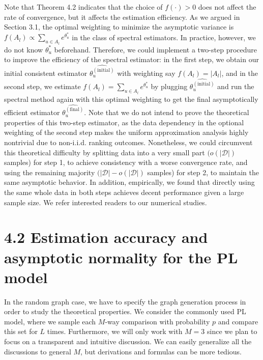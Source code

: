 Note that Theorem 4.2 indicates that the choice of \(f(\cdot) > 0\) does not affect the rate of convergence, but it affects the estimation efficiency. As we argued in Section 3.1, the optimal weighting to minimize the asymptotic variance is \(f(A_{l})\propto \sum_{u\in A_{l}}e^{\theta_{u}^{*}}\) in the class of spectral estimators. In practice, however, we do not know \(\theta_{u}^{*}\) beforehand. Therefore, we could implement a two-step procedure to improve the efficiency of the spectral estimator: in the first step, we obtain our initial consistent estimator \(\widehat{\theta_{u}^{(\mathrm{initial})}}\) with weighting say \(f(A_{l}) = |A_{l}|\), and in the second step, we estimate \(f(A_{l}) = \sum_{u\in A_{l}}e^{\theta_{u}^{*}}\) by plugging \(\widehat{\theta_{u}^{(\mathrm{initial})}}\) and run the spectral method again with this optimal weighting to get the final asymptotically efficient estimator \(\widehat{\theta_{u}^{(\mathrm{final})}}\). Note that we do not intend to prove the theoretical properties of this two-step estimator, as the data dependency in the optional weighting of the second step makes the uniform approximation analysis highly nontrivial due to non-i.i.d. ranking outcomes. Nonetheless, we could circumvent this theoretical difficulty by splitting data into a very small part \((o(|\mathcal{D}|)\) samples) for step 1, to achieve consistency with a worse convergence rate, and using the remaining majority \((|\mathcal{D}| - o(|\mathcal{D}|)\) samples) for step 2, to maintain the same asymptotic behavior. In addition, empirically, we found that directly using the same whole data in both steps achieves decent performance given a large sample size. We refer interested readers to our numerical studies.

\section{4.2 Estimation accuracy and asymptotic normality for the PL model}\label{estimation-accuracy-and-asymptotic-normality-for-the-pl-model}

In the random graph case, we have to specify the graph generation process in order to study the theoretical properties. We consider the commonly used PL model, where we sample each \(M\)-way comparison with probability \(p\) and compare this set for \(L\) times. Furthermore, we will only work with \(M = 3\) since we plan to focus on a transparent and intuitive discussion. We can easily generalize all the discussions to general \(M\), but derivations and formulas can be more tedious.


